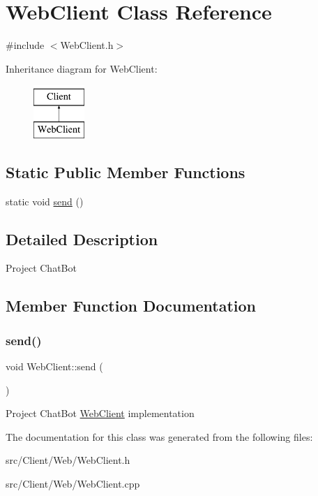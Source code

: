 \hypertarget{classWebClient}{}\section{Web\+Client Class Reference}
\label{classWebClient}


{\ttfamily \#include $<$Web\+Client.\+h$>$}

Inheritance diagram for Web\+Client\+:\begin{figure}[H]
\begin{center}
\leavevmode
\includegraphics[height=2.000000cm]{classWebClient}
\end{center}
\end{figure}
\subsection*{Static Public Member Functions}
\begin{DoxyCompactItemize}
\item 
static void \mbox{\hyperlink{classWebClient_a6a78982b8b198331bddf50ec02b6bc8c}{send}} ()
\end{DoxyCompactItemize}


\subsection{Detailed Description}
Project Chat\+Bot 

\subsection{Member Function Documentation}
\mbox{\label{classWebClient_a6a78982b8b198331bddf50ec02b6bc8c}} 
\subsubsection{\texorpdfstring{send()}{send()}}
{\footnotesize\ttfamily void Web\+Client\+::send (\begin{DoxyParamCaption}{ }\end{DoxyParamCaption})\hspace{0.3cm}{\ttfamily [static]}}

Project Chat\+Bot \mbox{\hyperlink{classWebClient}{Web\+Client}} implementation 

The documentation for this class was generated from the following files\+:\begin{DoxyCompactItemize}
\item 
src/\+Client/\+Web/Web\+Client.\+h\item 
src/\+Client/\+Web/Web\+Client.\+cpp\end{DoxyCompactItemize}
